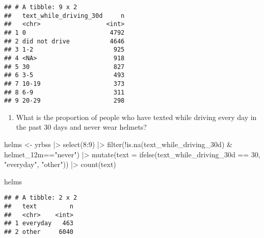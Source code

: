 \documentclass[
]{article}
\newenvironment{Shaded}{\begin{snugshade}}{\end{snugshade}}
\newcommand{\AttributeTok}[1]{\textcolor[rgb]{0.77,0.63,0.00}{#1}}
\newcommand{\DecValTok}[1]{\textcolor[rgb]{0.00,0.00,0.81}{#1}}
\newcommand{\FunctionTok}[1]{\textcolor[rgb]{0.00,0.00,0.00}{#1}}
\newcommand{\NormalTok}[1]{#1}
\newcommand{\OtherTok}[1]{\textcolor[rgb]{0.56,0.35,0.01}{#1}}
\newcommand{\SpecialCharTok}[1]{\textcolor[rgb]{0.00,0.00,0.00}{#1}}
\newcommand{\StringTok}[1]{\textcolor[rgb]{0.31,0.60,0.02}{#1}}
\providecommand{\tightlist}{%
  \setlength{\itemsep}{0pt}\setlength{\parskip}{0pt}}
\begin{document}
\begin{verbatim}
## # A tibble: 9 x 2
##   text_while_driving_30d     n
##   <chr>                  <int>
## 1 0                       4792
## 2 did not drive           4646
## 3 1-2                      925
## 4 <NA>                     918
## 5 30                       827
## 6 3-5                      493
## 7 10-19                    373
## 8 6-9                      311
## 9 20-29                    298
\end{verbatim}

\begin{enumerate}
\def\labelenumi{\arabic{enumi}.}
\setcounter{enumi}{1}
\tightlist
\item
  What is the proportion of people who have texted while driving every
  day in the past 30 days and never wear helmets?
\end{enumerate}

\begin{Shaded}
\begin{Highlighting}[]
\NormalTok{helms }\OtherTok{\textless{}{-}}\NormalTok{ yrbss }\SpecialCharTok{|\textgreater{}}
  \FunctionTok{select}\NormalTok{(}\DecValTok{8}\SpecialCharTok{:}\DecValTok{9}\NormalTok{) }\SpecialCharTok{|\textgreater{}}
  \FunctionTok{filter}\NormalTok{(}\SpecialCharTok{!}\FunctionTok{is.na}\NormalTok{(text\_while\_driving\_30d) }\SpecialCharTok{\&} 
\NormalTok{                helmet\_12m}\SpecialCharTok{==}\StringTok{"never"}\NormalTok{) }\SpecialCharTok{|\textgreater{}}
  \FunctionTok{mutate}\NormalTok{(}\AttributeTok{text =} \FunctionTok{ifelse}\NormalTok{(text\_while\_driving\_30d }\SpecialCharTok{==} \DecValTok{30}\NormalTok{, }\StringTok{"everyday"}\NormalTok{, }\StringTok{"other"}\NormalTok{)) }\SpecialCharTok{|\textgreater{}}
  \FunctionTok{count}\NormalTok{(text)}

\NormalTok{helms}
\end{Highlighting}
\end{Shaded}

\begin{verbatim}
## # A tibble: 2 x 2
##   text         n
##   <chr>    <int>
## 1 everyday   463
## 2 other     6040
\end{verbatim}

\begin{Shaded}
\end{Shaded}
\end{document}
